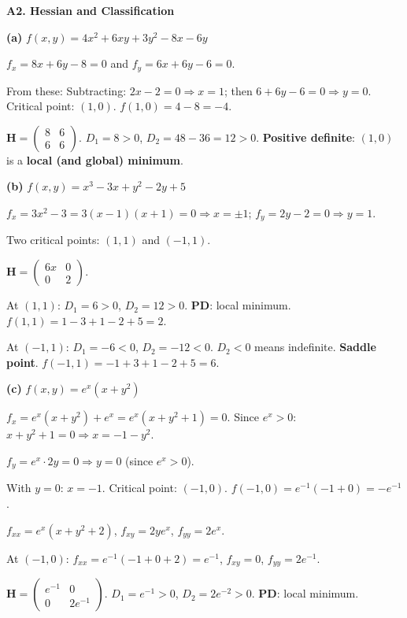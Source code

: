 \documentclass[12pt, a4paper]{article}
\theoremstyle{definition}
\newcommand{\bH}{\mathbf{H}}
\begin{document}
\begin{solbox}
\textbf{A2. Hessian and Classification}

\textbf{(a)} $f(x,y)=4x^2+6xy+3y^2-8x-6y$

$f_x=8x+6y-8=0$ and $f_y=6x+6y-6=0$.

From these: Subtracting: $2x-2=0 \Rightarrow x=1$; then $6+6y-6=0 \Rightarrow y=0$.
Critical point: $(1,0)$. $f(1,0)=4-8=-4$.

$\bH=\begin{pmatrix}8&6\\6&6\end{pmatrix}$.
$D_1=8>0$, $D_2=48-36=12>0$. \textbf{Positive definite}: $(1,0)$ is a \textbf{local (and global) minimum}.

\medskip
\textbf{(b)} $f(x,y)=x^3-3x+y^2-2y+5$

$f_x=3x^2-3=3(x-1)(x+1)=0 \Rightarrow x=\pm1$;\quad
$f_y=2y-2=0 \Rightarrow y=1$.

Two critical points: $(1,1)$ and $(-1,1)$.

$\bH=\begin{pmatrix}6x&0\\0&2\end{pmatrix}$.

At $(1,1)$: $D_1=6>0$, $D_2=12>0$. \textbf{PD}: local minimum. $f(1,1)=1-3+1-2+5=2$.

At $(-1,1)$: $D_1=-6<0$, $D_2=-12<0$. $D_2<0$ means indefinite. \textbf{Saddle point}. $f(-1,1)=-1+3+1-2+5=6$.

\medskip
\textbf{(c)} $f(x,y)=e^x(x+y^2)$

$f_x = e^x(x+y^2)+e^x = e^x(x+y^2+1) = 0$.
Since $e^x>0$: $x+y^2+1=0 \Rightarrow x=-1-y^2$.

$f_y = e^x\cdot 2y = 0 \Rightarrow y=0$ (since $e^x>0$).

With $y=0$: $x=-1$. Critical point: $(-1,0)$. $f(-1,0)=e^{-1}(-1+0)=-e^{-1}$.

$f_{xx}=e^x(x+y^2+2)$, $f_{xy}=2ye^x$, $f_{yy}=2e^x$.

At $(-1,0)$: $f_{xx}=e^{-1}(-1+0+2)=e^{-1}$, $f_{xy}=0$, $f_{yy}=2e^{-1}$.

$\bH=\begin{pmatrix}e^{-1}&0\\0&2e^{-1}\end{pmatrix}$.
$D_1=e^{-1}>0$, $D_2=2e^{-2}>0$. \textbf{PD}: local minimum.
\end{solbox}
\end{document}
